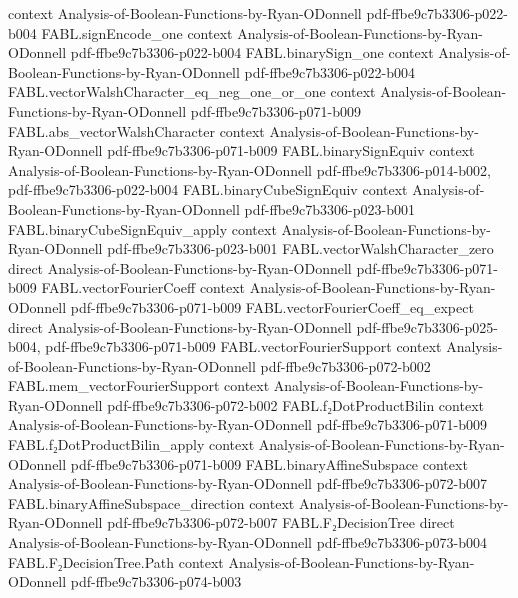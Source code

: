 \begin{theorem}
  {context}
  {Analysis-of-Boolean-Functions-by-Ryan-ODonnell}
  {pdf-ffbe9c7b3306-p022-b004}
\proofstep
  {FABL.signEncode_one}
  {context}
  {Analysis-of-Boolean-Functions-by-Ryan-ODonnell}
  {pdf-ffbe9c7b3306-p022-b004}
\proofstep
  {FABL.binarySign_one}
  {context}
  {Analysis-of-Boolean-Functions-by-Ryan-ODonnell}
  {pdf-ffbe9c7b3306-p022-b004}
\proofstep
  {FABL.vectorWalshCharacter_eq_neg_one_or_one}
  {context}
  {Analysis-of-Boolean-Functions-by-Ryan-ODonnell}
  {pdf-ffbe9c7b3306-p071-b009}
\proofstep
  {FABL.abs_vectorWalshCharacter}
  {context}
  {Analysis-of-Boolean-Functions-by-Ryan-ODonnell}
  {pdf-ffbe9c7b3306-p071-b009}
\proofstep
  {FABL.binarySignEquiv}
  {context}
  {Analysis-of-Boolean-Functions-by-Ryan-ODonnell}
  {pdf-ffbe9c7b3306-p014-b002,
    pdf-ffbe9c7b3306-p022-b004}
\proofstep
  {FABL.binaryCubeSignEquiv}
  {context}
  {Analysis-of-Boolean-Functions-by-Ryan-ODonnell}
  {pdf-ffbe9c7b3306-p023-b001}
\proofstep
  {FABL.binaryCubeSignEquiv_apply}
  {context}
  {Analysis-of-Boolean-Functions-by-Ryan-ODonnell}
  {pdf-ffbe9c7b3306-p023-b001}
\proofstep
  {FABL.vectorWalshCharacter_zero}
  {direct}
  {Analysis-of-Boolean-Functions-by-Ryan-ODonnell}
  {pdf-ffbe9c7b3306-p071-b009}
\proofstep
  {FABL.vectorFourierCoeff}
  {context}
  {Analysis-of-Boolean-Functions-by-Ryan-ODonnell}
  {pdf-ffbe9c7b3306-p071-b009}
\proofstep
  {FABL.vectorFourierCoeff_eq_expect}
  {direct}
  {Analysis-of-Boolean-Functions-by-Ryan-ODonnell}
  {pdf-ffbe9c7b3306-p025-b004,
    pdf-ffbe9c7b3306-p071-b009}
\proofstep
  {FABL.vectorFourierSupport}
  {context}
  {Analysis-of-Boolean-Functions-by-Ryan-ODonnell}
  {pdf-ffbe9c7b3306-p072-b002}
\proofstep
  {FABL.mem_vectorFourierSupport}
  {context}
  {Analysis-of-Boolean-Functions-by-Ryan-ODonnell}
  {pdf-ffbe9c7b3306-p072-b002}
\proofstep
  {FABL.f₂DotProductBilin}
  {context}
  {Analysis-of-Boolean-Functions-by-Ryan-ODonnell}
  {pdf-ffbe9c7b3306-p071-b009}
\proofstep
  {FABL.f₂DotProductBilin_apply}
  {context}
  {Analysis-of-Boolean-Functions-by-Ryan-ODonnell}
  {pdf-ffbe9c7b3306-p071-b009}
\proofstep
  {FABL.binaryAffineSubspace}
  {context}
  {Analysis-of-Boolean-Functions-by-Ryan-ODonnell}
  {pdf-ffbe9c7b3306-p072-b007}
\proofstep
  {FABL.binaryAffineSubspace_direction}
  {context}
  {Analysis-of-Boolean-Functions-by-Ryan-ODonnell}
  {pdf-ffbe9c7b3306-p072-b007}
\proofstep
  {FABL.F₂DecisionTree}
  {direct}
  {Analysis-of-Boolean-Functions-by-Ryan-ODonnell}
  {pdf-ffbe9c7b3306-p073-b004}
\proofstep
  {FABL.F₂DecisionTree.Path}
  {context}
  {Analysis-of-Boolean-Functions-by-Ryan-ODonnell}
  {pdf-ffbe9c7b3306-p074-b003}

\end{theorem}
